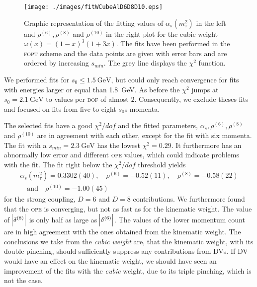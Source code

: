 \documentclass[../../index.tex]{subfiles}
\begin{document}
\begin{figure}
  \centering \texttt{[image: ./images/fitWCubeAlD6D8D10.eps]}
  \caption{Graphic representation of the fitting values of
    \(\alpha_s(m_\tau^2)\) in the left and \(\rho^{(6)}, \rho^{(8)}\) and
    \(\rho^{(10)}\) in the right plot for the cubic weight
    \(\omega(x)=(1-x)^3(1+3x)\). The fits have been performed in the
    \textsc{fopt} scheme and the data points are given with error bars and are
    ordered by increasing \(s_{min}\). The grey line displays the \(\chi^2\)
    function.}
  \label{fig:fitWCubeAlpha}
\end{figure}

We performed fits for \(s_0 \leq \SI{1.5}{\giga\eV}\), but could only reach
convergence for fits with energies larger or equal than \SI{1.8}{\giga\eV}. As
before the \(\chi^2\) jumps at \(s_0=\SI{2.1}{\giga\eV}\) to values per
\textsc{dof} of almost \(2\). Consequently, we exclude theses fits and focused
on fits from five to eight \(s_0\)s momenta.

The selected fits have a good \(\chi^2/dof\) and the fitted parameters,
\(\alpha_s, \rho^{(6)}, \rho^{(8)}\) and \(\rho^{(10)}\) are in agreement with
each other, except for the fit with six momenta. The fit with a
\(s_{min}=\SI{2.3}{\giga\eV}\) has the lowest \(\chi^2=0.29\). It furthermore
has an abnormally low error and different \textsc{ope} values, which could
indicate problems with the fit. The fit right below the \(\chi^2/dof\) threshold
yields 
\begin{equation}
  \begin{split}
    \alpha_s(m_\tau^2)=0.3302(40), \quad \rho^{(6)}=-0.52(11), \quad \rho^{(8)}=-0.58(22)\\
    \quad \text{and} \quad \rho^{(10)}=-1.00(45)
  \end{split}
\end{equation}
for the strong coupling, \(D=6\) and \(D=8\) contributions.
We furthermore found that the \textsc{ope} is converging, but not as fast as for
the kinematic weight. The value of \(\abs{\delta^{(8)}}\) is only half as large
as \(\abs{\delta^{(6)}}\). The values of the lower momentum count are in high
agreement with the ones obtained from the kinematic weight. The conclusions we
take from the \textit{cubic weight} are, that the kinematic weight, with its
double pinching, should sufficiently suppress any contributions from
\textsc{DV}s. If \textsc{DV} would have an effect on the kinematic weight, we
should have seen an improvement of the fits with the \textit{cubic} weight, due
to its triple pinching, which is not the case.
\end{document}
